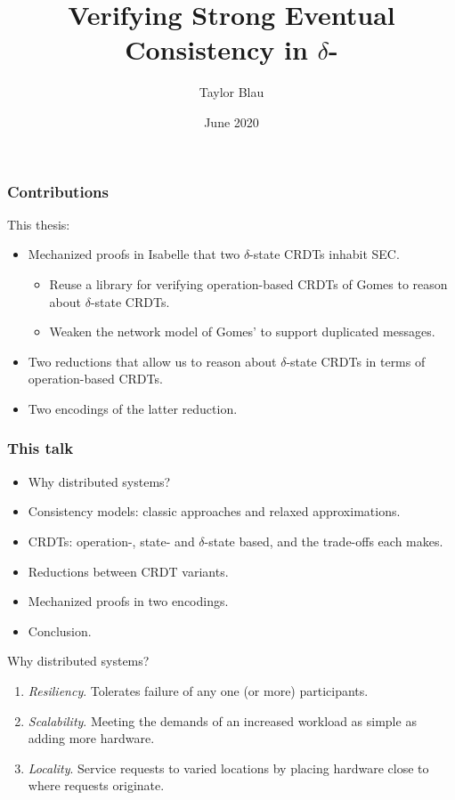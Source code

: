 \documentclass[aspectratio=169,compress,handout]{beamer}
\title{Verifying Strong Eventual Consistency in $\delta$-\CRDTs}
\author{Taylor Blau}
\institute{University of Washington}
\date{June 2020}
\newcommand*{\CRDT}{\textsf{CRDT}\xspace}
\newcommand*{\CRDTs}{\textsf{CRDTs}\xspace}
\newcommand*{\SEC}{\textsf{SEC}\xspace}
\begin{document}
  \frame{\titlepage}

  \begin{frame}
    \frametitle{Contributions}

    This thesis:
    \begin{itemize}[<+->]
      \item Mechanized proofs in Isabelle that two $\delta$-state \CRDTs inhabit
        \SEC.
        \begin{itemize}
          \item Reuse a library for verifying operation-based \CRDTs of Gomes to
            reason about $\delta$-state \CRDTs.
          \item Weaken the network model of Gomes' to support duplicated
            messages.
        \end{itemize}
      \item Two reductions that allow us to reason about $\delta$-state \CRDTs
        in terms of operation-based \CRDTs.
      \item Two encodings of the latter reduction.
    \end{itemize}
  \end{frame}

  \begin{frame}
    \frametitle{This talk}

    \begin{itemize}[<+->]
      \item Why distributed systems?
      \item Consistency models: classic approaches and relaxed approximations.
      \item \CRDTs: operation-, state- and $\delta$-state based, and the
        trade-offs each makes.
      \item Reductions between \CRDT variants.
      \item Mechanized proofs in two encodings.
      \item Conclusion.
    \end{itemize}
  \end{frame}

  \begin{frame}
    Why distributed systems?
    \begin{enumerate}
      \item \emph{Resiliency}. Tolerates failure of any one (or more)
        participants.
      \item \emph{Scalability}. Meeting the demands of an increased workload as
        simple as adding more hardware.
      \item \emph{Locality}. Service requests to varied locations by placing
        hardware close to where requests originate.
    \end{enumerate}
  \end{frame}
\end{document}
